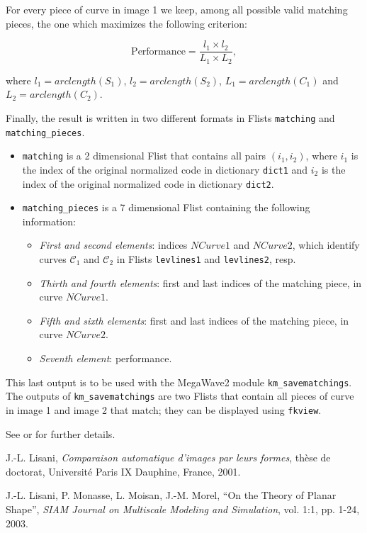 For every piece of curve in image 1 we keep, among all possible valid
matching pieces, the one which maximizes the following criterion:

$$\mbox{Performance} = \frac{l_1 \times l_2}{L_1 \times L_2},$$

where $l_1=arclength(S_1)$, $l_2=arclength(S_2)$, $L_1=arclength(C_1)$
and $L_2=arclength(C_2)$.

Finally, the result is written in two different formats in Flists
\verb+matching+ and \verb+matching_pieces+. 

\begin{itemize}

\item \verb+matching+ is a 2 dimensional Flist that contains all pairs
$(i_1,i_2)$, where $i_1$ is the index of the original normalized code
in dictionary \verb+dict1+ and $i_2$ is the index of the original
normalized code in dictionary \verb+dict2+.

\item \verb+matching_pieces+ is a 7 dimensional Flist containing the
  following information:

  \begin{itemize}

  \item {\em First and second elements}: indices $NCurve1$ and
    $NCurve2$, which identify curves ${\mathcal C}_1$ and ${\mathcal C}_2$
    in Flists \verb+levlines1+ and \verb+levlines2+, resp.
  
  \item {\em Thirth and fourth elements}: first and last indices of the
    matching piece, in curve $NCurve1$.

  \item {\em Fifth and sixth elements}: first and last indices of the
    matching piece, in curve $NCurve2$.

  \item {\em Seventh element}: performance.
    
  \end{itemize}

\end{itemize}

This last output is to be used with the MegaWave2
module \verb+km_savematchings+. The
outputs of \verb+km_savematchings+ are two Flists that contain all pieces of
curve in image 1 and image 2 that match; they can be displayed using
\verb+fkview+.

\bigskip
See \cite{joseluis} or \cite{LMMM} for further details.


\begin{thebibliography}{9}

 J.-L. {\sc Lisani}, {\it Comparaison automatique
d'images par leurs formes}, th\`ese de doctorat, Universit\'e Paris IX
Dauphine, France, 2001.

 J.-L. Lisani, P. Monasse, L. Moisan, J.-M. Morel, 
``On the Theory of Planar Shape'', 
{\it SIAM Journal on Multiscale Modeling and Simulation}, 
vol. 1:1, pp. 1-24, 2003. 

\end{thebibliography}

